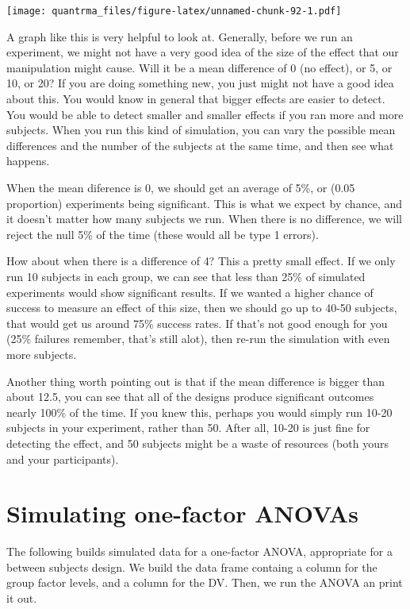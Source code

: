 \documentclass[
]{book}
\begin{document}
\texttt{[image: quantrma\_files/figure-latex/unnamed-chunk-92-1.pdf]}

A graph like this is very helpful to look at. Generally, before we run an experiment, we might not have a very good idea of the size of the effect that our manipulation might cause. Will it be a mean difference of 0 (no effect), or 5, or 10, or 20? If you are doing something new, you just might not have a good idea about this. You would know in general that bigger effects are easier to detect. You would be able to detect smaller and smaller effects if you ran more and more subjects. When you run this kind of simulation, you can vary the possible mean differences and the number of the subjects at the same time, and then see what happens.

When the mean diference is 0, we should get an average of 5\%, or (0.05 proportion) experiments being significant. This is what we expect by chance, and it doesn't matter how many subjects we run. When there is no difference, we will reject the null 5\% of the time (these would all be type 1 errors).

How about when there is a difference of 4? This a pretty small effect. If we only run 10 subjects in each group, we can see that less than 25\% of simulated experiments would show significant results. If we wanted a higher chance of success to measure an effect of this size, then we should go up to 40-50 subjects, that would get us around 75\% success rates. If that's not good enough for you (25\% failures remember, that's still alot), then re-run the simulation with even more subjects.

Another thing worth pointing out is that if the mean difference is bigger than about 12.5, you can see that all of the designs produce significant outcomes nearly 100\% of the time. If you knew this, perhaps you would simply run 10-20 subjects in your experiment, rather than 50. After all, 10-20 is just fine for detecting the effect, and 50 subjects might be a waste of resources (both yours and your participants).

\hypertarget{simulating-one-factor-anovas}{%
\section{Simulating one-factor ANOVAs}\label{simulating-one-factor-anovas}}

The following builds simulated data for a one-factor ANOVA, appropriate for a between subjects design. We build the data frame containg a column for the group factor levels, and a column for the DV. Then, we run the ANOVA an print it out.
\end{document}
